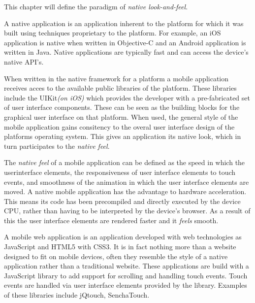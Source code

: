 This chapter will define the paradigm of \emph{native look-and-feel}.

A native application is an application inherent to the platform for which it was built using techniques proprietary to the platform. For example, an iOS application is native when written in Objective-C and an Android application is written in Java. Native applications are typically fast and can access the device's native API's.

When written in the native framework for a platform a mobile application receives acces to the available public libraries of the platform. These libraries include the UIKit\emph{(on iOS)} which provides the developer with a pre-fabricated set of user interface components. These can be seen as the building blocks for the graphical user interface on that platform. When used, the general style of the mobile application gains consitency to the overal user interface design of the platforms operating system. This gives an application its native look, which in turn participates to the \emph{native feel}.


The \emph{native feel} of a mobile application can be defined as the speed in which the userinterface elements, the responsiveness of user interface elements to touch events, and smoothness of the animation in which the user interface elements are moved. A native mobile application has the advantage to hardware acceleration. This means its code has been precompiled and directly executed by the device CPU, rather than having to be interpreted by the device's browser. As a result of this the user interface elements are rendered faster and it \emph{feels} smooth.
 	

A mobile web application is an application developed with web technologies as JavaScript and HTML5 with CSS3. It is in fact nothing more than a website designed to fit on mobile devices, often they resemble the style of a native application rather than a traditional website. These applications are build with a JavaScript library to add support for scrolling and handling touch events. Touch events are handled via user interface elements provided by the library. Examples of these libraries include jQtouch, SenchaTouch.

